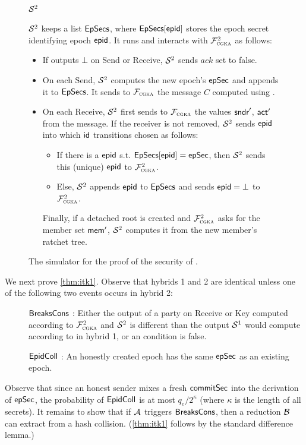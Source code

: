 \begin{figure*}[tbp]
\begin{simulatorbox}{\normalsize $\mathcal{S}_{\textsc{\relax}}^2$}{\raggedright
  $\mathcal{S}_{\textsc{\relax}}^2$ keeps a list ${\mathsf{EpSecs}}$, where ${\mathsf{EpSecs}}[{\normalfont\textsf{epid}}]$ stores the epoch secret identifying epoch ${\normalfont\textsf{epid}}$. It runs \saik and interacts with $\mathcal{F}_{\normalfont\textsc{cgka}}^2$ as follows:
  \begin{itemize}[itemsep=0pt]
    \item If \saik outputs $\bot$ on Send or Receive, $\mathcal{S}_{\textsc{\relax}}^2$ sends $\textit{ack}$ set to false.
    \item On each Send, $\mathcal{S}_{\textsc{\relax}}^2$ computes the new epoch's ${\mathsf{epSec}}$ and appends it to ${\mathsf{EpSecs}}$. It sends to $\mathcal{F}_{\normalfont\textsc{cgka}}$ the message $C$ computed using \saik.
    \item On each Receive, $\mathcal{S}_{\textsc{\relax}}^2$ first sends to $\mathcal{F}_{\normalfont\textsc{cgka}}$ the values $\mathsf{sndr}'$, $\mathsf{act}'$ from the message. If the receiver is not removed, $\mathcal{S}_{\textsc{\relax}}^2$ sends ${\normalfont\textsf{epid}}$ into which ${\mathsf{id}}$ transitions chosen as follows:
    \begin{itemize}[itemsep=0pt,topsep=0pt]
      \item If there is a ${\normalfont\textsf{epid}}$ s.t. ${\mathsf{EpSecs}}[{\normalfont\textsf{epid}}]={\mathsf{epSec}}$, then $\mathcal{S}_{\textsc{\relax}}^2$ sends this (unique) ${\normalfont\textsf{epid}}$ to $\mathcal{F}_{\normalfont\textsc{cgka}}^2$.
      \item Else, $\mathcal{S}_{\textsc{\relax}}^2$ appends ${\normalfont\textsf{epid}}$ to ${\mathsf{EpSecs}}$ and sends ${\normalfont\textsf{epid}}=\bot$ to $\mathcal{F}_{\normalfont\textsc{cgka}}^2$.
    \end{itemize}
    Finally, if a detached root is created and $\mathcal{F}_{\normalfont\textsc{cgka}}^2$ asks for the member set $\mathsf{mem}'$, $\mathcal{S}_{\textsc{\relax}}^2$ computes it from the new member's ratchet tree.
  \end{itemize}}
\end{simulatorbox}
\caption{The simulator for the proof of the security of \saik.}\label{fig:simu}
\end{figure*}

 We next prove \cref{thm:itk1}. Observe that hybrids 1 and 2 are identical unless one of the following two events occurs in hybrid 2:
\begin{description}
  \item[] $\textnormal{\textsf{BreaksCons}}$ : Either the output of a party on Receive or Key computed according to $\mathcal{F}_{\normalfont\textsc{cgka}}^2$ and $\mathcal{S}_{\textsc{\relax}}^2$ is different than the output $\mathcal{S}_{\textsc{\relax}}^1$ would compute according to \saik in hybrid 1, or an \KwAss{} condition is false.
  \item[] $\textnormal{\textsf{EpidColl}}$ : An honestly created epoch has the same ${\mathsf{epSec}}$ as an existing epoch.
\end{description}
Observe that since an honest sender mixes a fresh ${\mathsf{commitSec}}$ into the derivation of ${\mathsf{epSec}}$, the probability of $\textnormal{\textsf{EpidColl}}$ is at most $q_e/2^\kappa$ (where $\kappa$ is the length of all secrets).
It remains to show that if $\mathcal{A}_{\relax}$ triggers $\textnormal{\textsf{BreaksCons}}$, then a reduction $\mathcal{B}_{\relax}$ can extract from a hash collision. (\cref{thm:itk1} follows by the standard difference lemma.)

